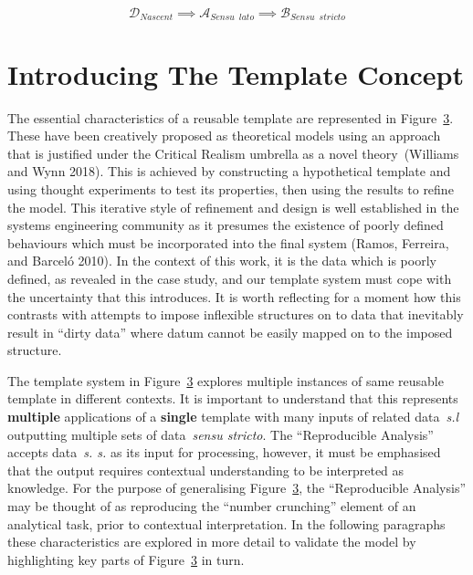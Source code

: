 \documentclass[
]{article}
\begin{document}
\[\label{eq:_three_states}
    \mathscr{D}_{Nascent} \implies
    \mathscr{A}_{Sensu \enspace lato} \implies
    \mathscr{B}_{Sensu \enspace stricto}\]

\hypertarget{sec:template-concept}{%
\section{Introducing The Template Concept}\label{sec:template-concept}}

The essential characteristics of a reusable template are represented in
Figure~\protect\hyperlink{fig_essential_template}{3}. These have been
creatively proposed as theoretical models using an approach that is
justified under the Critical Realism umbrella as a novel
theory~(Williams and Wynn 2018). This is achieved by constructing a
hypothetical template and using thought experiments to test its
properties, then using the results to refine the model. This iterative
style of refinement and design is well established in the systems
engineering community as it presumes the existence of poorly defined
behaviours which must be incorporated into the final system (Ramos,
Ferreira, and Barceló 2010). In the context of this work, it is the data
which is poorly defined, as revealed in the case study, and our template
system must cope with the uncertainty that this introduces. It is worth
reflecting for a moment how this contrasts with attempts to impose
inflexible structures on to data that inevitably result in ``dirty
data'' where datum cannot be easily mapped on to the imposed structure.

The template system in
Figure~\protect\hyperlink{fig_essential_template}{3} explores multiple
instances of same reusable template in different contexts. It is
important to understand that this represents \textbf{multiple}
applications of a \textbf{single} template with many inputs of related
data~\emph{s.l} outputting multiple sets of data~\emph{sensu stricto}.
The ``Reproducible Analysis'' accepts data~\emph{s. s.} as its input for
processing, however, it must be emphasised that the output requires
contextual understanding to be interpreted as knowledge. For the purpose
of generalising Figure~\protect\hyperlink{fig_essential_template}{3},
the ``Reproducible Analysis'' may be thought of as reproducing the
``number crunching'' element of an analytical task, prior to contextual
interpretation. In the following paragraphs these characteristics are
explored in more detail to validate the model by highlighting key parts
of Figure~\protect\hyperlink{fig_essential_template}{3} in turn.
\end{document}

